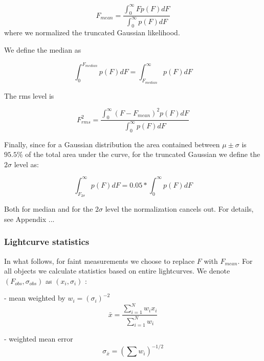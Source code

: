 \documentclass[fleqn,usenatbib]{mnras}  %
\begin{document}
\begin{equation}
F_{mean} = \frac{\int _{0} ^ {\infty}{F p(F) dF}}{\int _{0} ^ {\infty}{p(F) dF}}
\end{equation} 
where we normalized the truncated Gaussian likelihood.
 
We define the median as  

\begin{equation}
\int _{0} ^ {F_{median}} {p(F) dF} = \int _{F_{median}} ^ {\infty} {p(F) dF}
\end{equation} 

The rms level is

\begin{equation}
F_{rms}^{2} = \frac{\int _{0} ^ {\infty}{(F-F_{mean})^{2} p(F) dF}}{\int _{0} ^ {\infty}{p(F) dF}} 
\end{equation}

Finally, since for a Gaussian distribution the area contained between $\mu \pm \sigma$ is $95.5 \%$ of the total area under the curve, for the truncated Gaussian we define the  $2 \sigma$ level as:

\begin{equation}
\int _{F_{2 \sigma}} ^{\infty} {p(F)dF} = 0.05 * \int _{0} ^{\infty} {p(F) dF} 
\end{equation}

Both for median and for the $2\sigma$ level the normalization cancels out. For details, see Appendix ... 

\subsubsection{Lightcurve statistics}
In what follows, for faint measurements we choose to replace $F$ with $F_{mean}$. For all objects we calculate statistics based on entire lightcurves. We denote $(F_{obs}, \sigma_{obs})$ as $(x_{i},\sigma_{i})$ : 

- mean weighted by  $w_{i} = (\sigma_{i})^{-2}$
\begin{equation}
\bar{x} = \frac{\sum_{i=1}^{N}{w_{i}x_{i}}}{\sum_{i=1}^{N}{w_{i}}}
\end{equation}

- weighted mean error 
\begin{equation}
\sigma_{\bar{x}} = \left( \sum{w_{i}}\right) ^{-1/2} 
\end{equation}
\end{document}
